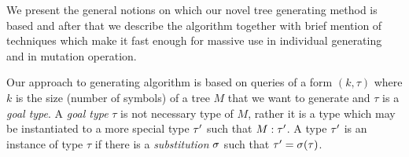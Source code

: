 \documentclass{ws-ijait}
\begin{document}
\newcommand{\abs}[1]{\lvert #1 \rvert}



\newcommand{\nv}{v}
\newcommand{\nvPr}{\nv^\prime}



We present the general notions on which our novel tree generating method is based and after that we describe the algorithm together with brief mention of techniques which make it fast enough for massive use in individual generating and in mutation operation.





Our approach to generating algorithm is based on queries of a form $(k,\tau)$ where $k$ is the size (number of symbols) of a tree $M$ that we want to generate and $\tau$ is a \textit{goal type}. A \textit{goal type} $\tau$ is not necessary type of $M$, rather it is a type which may be instantiated to a more special type $\tau^\prime$ such that $M : \tau^\prime$. A type $\tau^\prime$ is an instance of type $\tau$ if there is a \textit{substitution} $\sigma$ such that $\tau^\prime = \sigma(\tau)$. 

\end{document}
